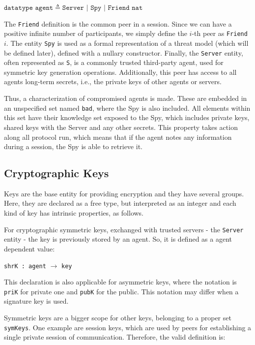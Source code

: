 \begin{center}
  $\texttt{datatype agent} \triangleq \texttt{Server } | \texttt{ Spy } | \texttt{  Friend nat}$
\end{center}

The \texttt{Friend} definition is the common peer in a session. Since we can have a positive infinite number of participants, we simply define the $i$-th peer as \texttt{Friend $i$}. The entity \texttt{Spy} is used as a formal representation of a threat model (which will be defined later), defined with a nullary constructor. Finally, the \texttt{Server} entity, often represented as \texttt{S}, is a commonly trusted third-party agent, used for symmetric key generation operations. Additionally, this peer has access to all agents long-term secrets, i.e., the private keys of other agents or servers.

Thus, a characterization of compromised agents is made. These are embedded in an unspecified set named \texttt{bad}, where the Spy is also included. All elements within this set have their knowledge set exposed to the Spy, which includes private keys, shared keys with the Server and any other secrets. This property takes action along all protocol run, which means that if the agent notes any information during a session, the Spy is able to retrieve it.

\subsection{Cryptographic Keys}
Keys are the base entity for providing encryption and they have several groups. Here, they are declared as a free type, but interpreted as an integer and each kind of key has intrinsic properties, as follows.

For cryptographic symmetric keys, exchanged with trusted servers - the \texttt{Server} entity - the key is previously stored by an agent. So, it is defined as a agent dependent value:

\begin{center}
  \texttt{shrK : agent} $\rightarrow$ \texttt{key}
\end{center}

This declaration is also applicable for asymmetric keys, where the notation is \texttt{priK} for private one and \texttt{pubK} for the public. This notation may differ when a signature key is used.

Symmetric keys are a bigger scope for other keys, belonging to a proper set \texttt{symKeys}. One example are session keys, which are used by peers for establishing a single private session of communication. Therefore, the valid definition is:


